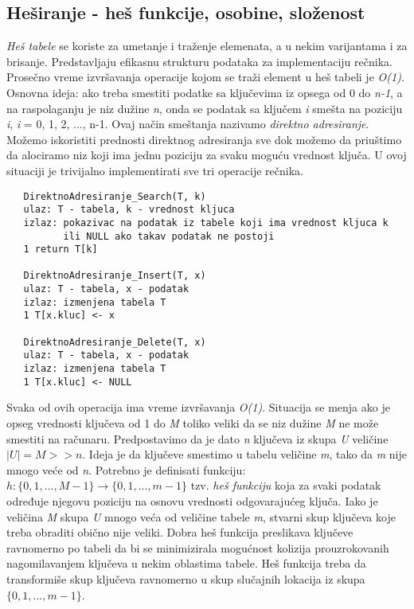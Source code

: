 \documentclass{article}
\begin{document}
\subsection{Heširanje - heš funkcije, osobine, složenost}
\textit{Heš tabele} se koriste za umetanje i traženje elemenata, a u nekim varijantama i za brisanje. Predstavljaju efikasnu strukturu podataka za implementaciju rečnika. Prosečno vreme izvršavanja operacije kojom se traži element u heš tabeli je \textit{O(1)}.
\newline
Osnovna ideja: ako treba smestiti podatke sa ključevima iz opsega od 0 do \textit{n-1}, a na raspolaganju je niz dužine \textit{n}, onda se podatak sa ključem \textit{i} smešta na poziciju \textit{i}, \textit{i} = 0, 1, 2, ..., n-1. Ovaj način smeštanja nazivamo \textit{direktno adresiranje}. Možemo iskoristiti prednosti direktnog adresiranja sve dok možemo da priuštimo da alociramo niz koji ima jednu poziciju za svaku moguću vrednost ključa. U ovoj situaciji je trivijalno implementirati sve tri operacije rečnika.
\begin{lstlisting}
   DirektnoAdresiranje_Search(T, k)
   ulaz: T - tabela, k - vrednost kljuca
   izlaz: pokazivac na podatak iz tabele koji ima vrednost kljuca k
          ili NULL ako takav podatak ne postoji
   1 return T[k] 
   
   DirektnoAdresiranje_Insert(T, x)
   ulaz: T - tabela, x - podatak
   izlaz: izmenjena tabela T
   1 T[x.kluc] <- x
   
   DirektnoAdresiranje_Delete(T, x)
   ulaz: T - tabela, x - podatak
   izlaz: izmenjena tabela T
   1 T[x.kluc] <- NULL
\end{lstlisting}
Svaka od ovih operacija ima vreme izvršavanja \textit{O(1)}.
\newline
Situacija se menja ako je opseg vrednosti ključeva od 1 do \textit{M} toliko veliki da se niz dužine \textit{M} ne može smestiti na računaru.
Predpostavimo da je dato \textit{n} ključeva iz skupa \textit{U} veličine $|U| = M >> n$. Ideja je da ključeve smestimo u tabelu veličine \textit{m}, tako da \textit{m} nije mnogo veće od \textit{n}.
Potrebno je definisati funkciju: 
$h : \{0, 1,..., M-1\} \longrightarrow \{0, 1,..., m-1\}$ tzv. \textit{heš funkciju} koja za svaki podatak određuje njegovu poziciju na osnovu vrednosti odgovarajućeg ključa. 
\newline
Iako je veličina \textit{M} skupa \textit{U} mnogo veća od veličine tabele \textit{m}, stvarni skup ključeva koje treba obraditi obično nije veliki. 
\newline Dobra heš funkcija preslikava ključeve ravnomerno po tabeli da bi se minimizirala mogućnost kolizija prouzrokovanih nagomilavanjem ključeva u nekim oblastima tabele. Heš funkcija treba da transformiše skup ključeva ravnomerno u skup slučajnih lokacija iz skupa $\{0, 1,..., m-1\}$.
\end{document}
